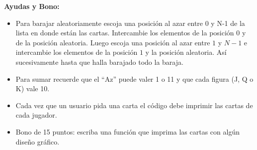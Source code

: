 \documentclass[11pt,letterpaper]{exam}
\begin{document}
\begin{questions}
\begin{parts}
\end{parts}
\vspace{1cm}
{\bf Ayudas y Bono:} 

\begin{itemize}

\item Para barajar aleatoriamente escoja una posición al azar entre 0 y N-1 de la lista en donde están las cartas.
      Intercambie los elementos de la posición $0$ y de la posición aleatoria.  Luego escoja una posición al azar
      entre $1$ y $N-1$ e intercambie los elementos de la posición $1$ y la posición aleatoria. Así sucesivamente hasta que halla barajado todo la baraja.
\item Para sumar recuerde que el ``Az'' puede valer 1 o 11 y que cada figura (J, Q o K) vale 10.
\item Cada vez que un usuario pida una carta el código debe imprimir las cartas de cada jugador. 
\item Bono de 15 puntos: escriba una función que imprima las cartas con algún diseño gráfico.

\end{itemize}

\end{questions}
\end{document}
